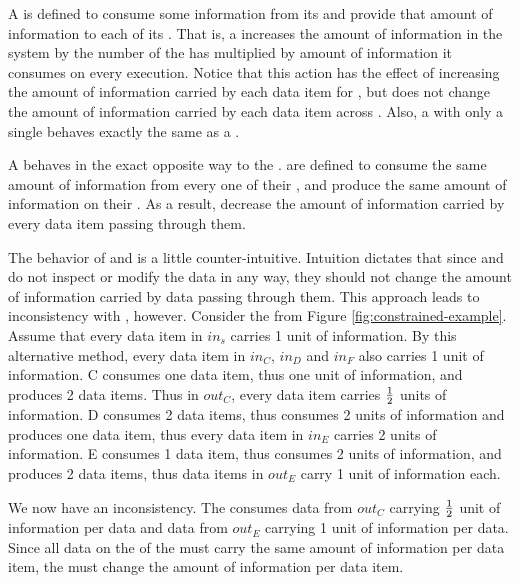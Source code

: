 A {\splitter} is defined to consume some information from its {\Input}
{\Channel} and provide that amount of information to each of its
{\Output} {\Channels}.  That is, a {\splitter} increases the amount of
information in the system by the number of {\Output} {\Channels} the
{\splitter} has multiplied by amount of information it consumes on
every execution. Notice that this action has the effect of
increasing the amount of information carried by each data item for
{\roundrobin} {\splitters}, but does not change the amount of
information carried by each data item across {\duplicate}
{\splitters}.  Also, a {\splitter} with only a single {\Output} {\Channel}
behaves exactly the same as a {\filter}.

A {\joiner} behaves in the exact opposite way to the {\splitter}.
{\joiners} are defined to consume the same amount of information
from every one of their {\Input} {\Channels}, and produce the same
amount of information on their {\Output} {\Channel}.  As a result,
{\joiners} decrease the amount of information carried by every data
item passing through them.

The behavior of {\splitters} and {\joiners} is a little
counter-intuitive.  Intuition dictates that since {\splitters} and
{\joiners} do not inspect or modify the data in any way, they should
not change the amount of information carried by data passing
through them.  This approach leads to inconsistency with
{\splitjoins}, however.  Consider the {\splitjoin} from Figure
\ref{fig:constrained-example}.  Assume that every data item in
{\Channel} $in_s$ carries 1 unit of information.  By this
alternative method, every data item in {\Channels} $in_C$, $in_D$
and $in_F$ also carries 1 unit of information.  {\filter} C consumes
one data item, thus one unit of information, and produces 2 data
items. Thus in {\Channel} $out_C$, every data item carries $1 \over
2$ units of information.  {\filter} D consumes 2 data items, thus
consumes 2 units of information and produces one data item, thus
every data item in {\Channel} $in_E$ carries 2 units of information.
{\filter} E consumes 1 data item, thus consumes 2 units of
information, and produces 2 data items, thus data items in
{\Channel} $out_E$ carry 1 unit of information each.

We now have an inconsistency.  The {\joiner} consumes data from
{\Channel} $out_C$ carrying $1 \over 2$ unit of information per data
and data from {\Channel} $out_E$ carrying 1 unit of information per
data. Since all data on the {\Output} {\Channel} of the {\joiner} must
carry the same amount of information per data item, the {\joiner}
must change the amount of information per data item.

